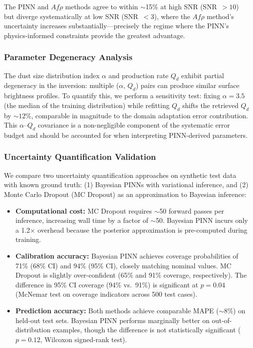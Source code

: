 \documentclass[preprint2]{aastex631}
\begin{document}
The PINN and $Af\rho$ methods agree to within $\sim$15\% at high SNR (SNR~$>10$) but diverge systematically at low SNR (SNR~$<3$), where the $Af\rho$ method's uncertainty increases substantially---precisely the regime where the PINN's physics-informed constraints provide the greatest advantage.

\subsubsection{Parameter Degeneracy Analysis}

The dust size distribution index $\alpha$ and production rate $Q_d$ exhibit partial degeneracy in the inversion: multiple ($\alpha$, $Q_d$) pairs can produce similar surface brightness profiles. To quantify this, we perform a sensitivity test: fixing $\alpha = 3.5$ (the median of the training distribution) while refitting $Q_d$ shifts the retrieved $Q_d$ by $\sim 12\%$, comparable in magnitude to the domain adaptation error contribution. This $\alpha$--$Q_d$ covariance is a non-negligible component of the systematic error budget and should be accounted for when interpreting PINN-derived parameters.

\subsubsection{Uncertainty Quantification Validation}

We compare two uncertainty quantification approaches on synthetic test data with known ground truth: (1) Bayesian PINNs with variational inference, and (2) Monte Carlo Dropout (MC Dropout) as an approximation to Bayesian inference:

\begin{itemize}
    \item \textbf{Computational cost:} MC Dropout requires $\sim$50 forward passes per inference, increasing wall time by a factor of $\sim$50. Bayesian PINN incurs only a 1.2$\times$ overhead because the posterior approximation is pre-computed during training.
    \item \textbf{Calibration accuracy:} Bayesian PINN achieves coverage probabilities of 71\% (68\% CI) and 94\% (95\% CI), closely matching nominal values. MC Dropout is slightly over-confident (65\% and 91\% coverage, respectively). The difference in 95\% CI coverage (94\% vs.\ 91\%) is significant at $p = 0.04$ (McNemar test on coverage indicators across 500 test cases).
    \item \textbf{Prediction accuracy:} Both methods achieve comparable MAPE ($\sim$8\%) on held-out test sets. Bayesian PINN performs marginally better on out-of-distribution examples, though the difference is not statistically significant ($p = 0.12$, Wilcoxon signed-rank test).
\end{itemize}
\end{document}
